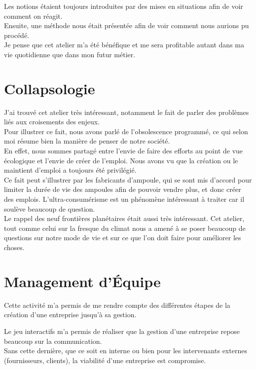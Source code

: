 {Les notions étaient toujours introduites par des mises en situations afin de voir comment on réagit.\\ Ensuite, une méthode nous était présentée afin de voir comment nous aurions pu procédé.\\
Je pense que cet atelier m'a été bénéfique et me sera profitable autant dans ma vie quotidienne que dans mon futur métier.


\section{Collapsologie}

J'ai trouvé cet atelier très intéressant, notamment le fait de parler des problèmes liés aux croisements des enjeux.\\
Pour illustrer ce fait, nous avons parlé de l'obsolescence programmé, ce qui selon moi résume bien la manière de penser de notre société.\\
En effet, nous sommes partagé entre l'envie de faire des efforts au point de vue écologique et l'envie de créer de l'emploi. Nous avons vu que la création ou le maintient d'emploi a toujours été privilégié.\\
Ce fait peut s'illustrer par les fabricants d'ampoule, qui se sont mis d'accord pour limiter la durée de vie des ampoules afin de pouvoir vendre plus, et donc créer des emplois. L'ultra-consumérisme est un phénomène intéressant à traiter car il soulève beaucoup de question.\\

Le rappel des neuf frontières planétaires était aussi très intéressant. Cet atelier, tout comme celui sur la fresque du climat nous a amené à se poser beaucoup de questions sur notre mode de vie et sur ce que l'on doit faire pour améliorer les choses.



\section{Management d'Équipe}

Cette activité m'a permis de me rendre compte des différentes étapes de la création d'une entreprise jusqu'à sa gestion.

Le jeu interactifs m'a permis de réaliser que la gestion d'une entreprise repose beaucoup sur la communication. \\
Sans cette dernière, que ce soit en interne ou bien pour les intervenants externes (fournisseurs, clients), la viabilité d'une entreprise est compromise.\\

}

